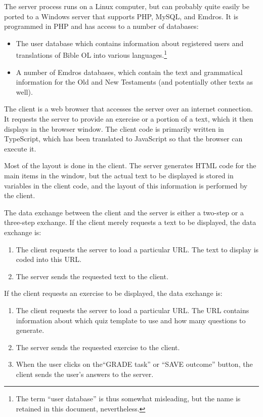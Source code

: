 \documentclass[11pt,oneside,a4paper]{memoir}
\begin{document}
The server process runs on a Linux computer, but can probably quite easily be ported to a Windows server
that supports PHP, MySQL, and Emdros. It is programmed in PHP and has access to a number of
databases:

\begin{itemize}
\item The user database which contains information about registered users and
  translations of Bible OL into various languages.\footnote{The term ``user database'' is thus
    somewhat misleading, but the name is retained in this document, nevertheless.}
\item A number of Emdros databases, which contain the text and grammatical information for the Old
  and New Testaments (and potentially other texts as well).
\end{itemize}

The client is a web browser that accesses the server over an
internet connection. It requests the server to provide an exercise or a portion of a text, which it
then displays in the browser window. The client code is primarily written in
TypeScript, which has been translated to JavaScript so that the
browser can execute it.

Most of the layout is done in the client. The server generates HTML code for the main items in the
window, but the actual text to be displayed is stored in variables in the client code, and the layout of
this information is performed by the client.

The data exchange between the client and the server is either a two-step or a three-step exchange.
If the client merely requests a text to be displayed, the data exchange is:

\begin{enumerate}
\item The client requests the server to load a particular URL. The text to display is coded into
  this URL.
\item The server sends the requested text to the client.
\end{enumerate}

If the client requests an exercise to be displayed, the data exchange is:

\begin{enumerate}
\item The client requests the server to load a particular URL. The URL contains information about which
  quiz template to use and how many questions to generate.
\item The server sends the requested exercise to the client.
\item When the user clicks on the``GRADE task''%
   or ``SAVE
  outcome'' button, the client sends the user's
  answers to the server.
\end{enumerate}
\end{document}
